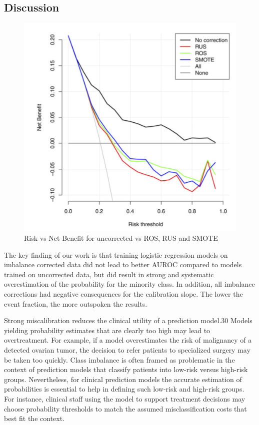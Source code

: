 \subsection{Discussion}
	\begin{figure}[h]
         	\includegraphics[height=0.5\textheight]{assets/risk_benefit_SMOTE_RUS_ROS.png}
         	\caption{Risk vs Net Benefit for uncorrected vs ROS, RUS and SMOTE}
         \end{figure}
	The key finding of our work is that training logistic regression models on imbalance corrected data did not lead to better AUROC 
	compared to models trained on uncorrected data, but did result in strong and systematic overestimation of the probability for the minority class. 
	In addition, all imbalance corrections had negative consequences for the calibration slope. 
	The lower the event fraction, the more outspoken the results.
	
	Strong miscalibration reduces the clinical utility of a prediction model.30 Models yielding probability estimates that are clearly too high may lead to overtreatment. 
	For example, if a model overestimates the risk of malignancy of a detected ovarian tumor, the decision to refer patients to specialized surgery may be taken too quickly. 
	Class imbalance is often framed as problematic in the context of prediction models that classify patients into low-risk versus high-risk groups. 
	Nevertheless, for clinical prediction models the accurate estimation of probabilities is essential to help in defining such low-risk and high-risk groups. 
	For instance, clinical staff using the model to support treatment decisions may choose probability thresholds
	to match the assumed misclassification costs that best fit the context.
	
